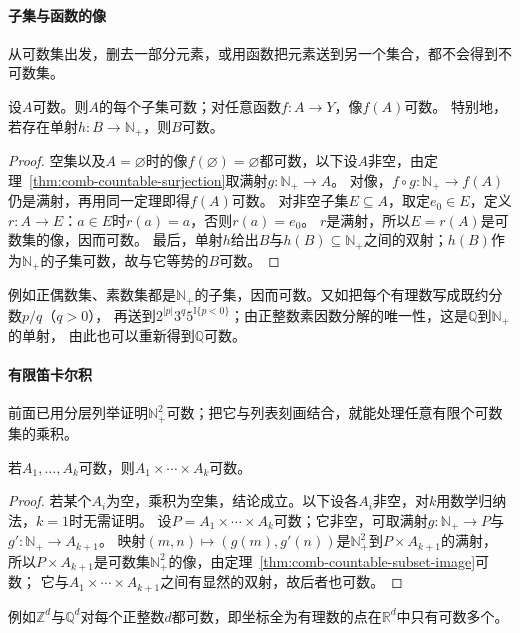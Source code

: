 \paragraph{子集与函数的像}
从可数集出发，删去一部分元素，或用函数把元素送到另一个集合，都不会得到不可数集。
\begin{theorem}[子集与像的可数性]
\label{thm:comb-countable-subset-image}
设$A$可数。则$A$的每个子集可数；对任意函数$f:A\to Y$，像$f(A)$可数。
特别地，若存在单射$h:B\to\mathbb N_+$，则$B$可数。
\end{theorem}
\begin{proof}
空集以及$A=\varnothing$时的像$f(\varnothing)=\varnothing$都可数，以下设$A$非空，由定理~\ref{thm:comb-countable-surjection}取满射$g:\mathbb N_+\to A$。
对像，$f\circ g:\mathbb N_+\to f(A)$仍是满射，再用同一定理即得$f(A)$可数。
对非空子集$E\subseteq A$，取定$e_0\in E$，定义$r:A\to E$：$a\in E$时$r(a)=a$，否则$r(a)=e_0$。
$r$是满射，所以$E=r(A)$是可数集的像，因而可数。
最后，单射$h$给出$B$与$h(B)\subseteq\mathbb N_+$之间的双射；$h(B)$作为$\mathbb N_+$的子集可数，故与它等势的$B$可数。
\end{proof}
例如正偶数集、素数集都是$\mathbb N_+$的子集，因而可数。又如把每个有理数写成既约分数$p/q$（$q>0$），
再送到$2^{|p|}3^{q}5^{\mathbb I\{p<0\}}$；由正整数素因数分解的唯一性，这是$\mathbb Q$到$\mathbb N_+$的单射，
由此也可以重新得到$\mathbb Q$可数。

\paragraph{有限笛卡尔积}
前面已用分层列举证明$\mathbb N_+^2$可数；把它与列表刻画结合，就能处理任意有限个可数集的乘积。
\begin{theorem}[有限笛卡尔积的可数性]
\label{thm:comb-countable-product}
若$A_1,\ldots,A_k$可数，则$A_1\times\cdots\times A_k$可数。
\end{theorem}
\begin{proof}
若某个$A_i$为空，乘积为空集，结论成立。以下设各$A_i$非空，对$k$用数学归纳法，$k=1$时无需证明。
设$P=A_1\times\cdots\times A_k$可数；它非空，可取满射$g:\mathbb N_+\to P$与$g':\mathbb N_+\to A_{k+1}$。
映射$(m,n)\mapsto(g(m),g'(n))$是$\mathbb N_+^2$到$P\times A_{k+1}$的满射，
所以$P\times A_{k+1}$是可数集$\mathbb N_+^2$的像，由定理~\ref{thm:comb-countable-subset-image}可数；
它与$A_1\times\cdots\times A_{k+1}$之间有显然的双射，故后者也可数。
\end{proof}
例如$\mathbb Z^d$与$\mathbb Q^d$对每个正整数$d$都可数，即坐标全为有理数的点在$\mathbb R^d$中只有可数多个。

